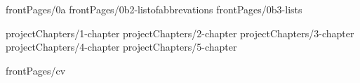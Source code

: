 \documentclass[a4paper,12pt,oneside,openany]{book}
\begin{document}
\onehalfspacing
{}

 {frontPages/0a}
 {frontPages/0b2-listofabbrevations}
 {frontPages/0b3-lists}

\onehalfspacing
\clearpage
{}

 {projectChapters/1-chapter}
 {projectChapters/2-chapter}
 {projectChapters/3-chapter}
 {projectChapters/4-chapter}
 {projectChapters/5-chapter}

\newpage\appendix


\newpage
{}
\singlespacing
\printbibliography[title={\bibName}]

\ifnum{}
\newpage
 {frontPages/cv}
\fi
\end{document}
